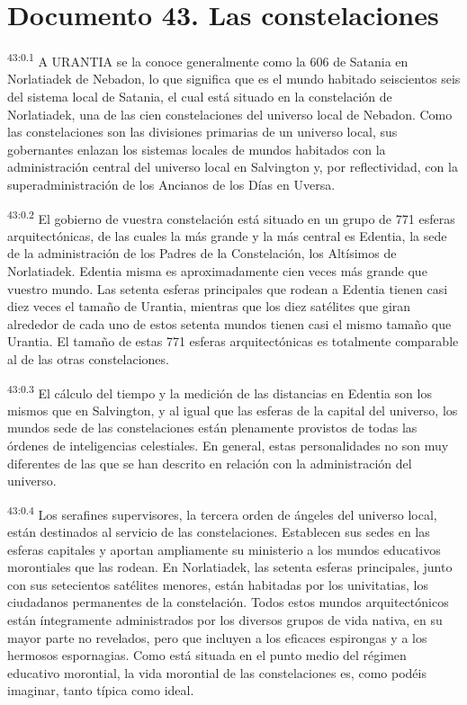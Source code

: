 \chapter{Documento 43. Las constelaciones}
\par
\textsuperscript{43:0.1} A URANTIA se la conoce generalmente como la 606 de Satania en Norlatiadek de Nebadon, lo que significa que es el mundo habitado seiscientos seis del sistema local de Satania, el cual está situado en la constelación de Norlatiadek, una de las cien constelaciones del universo local de Nebadon. Como las constelaciones son las divisiones primarias de un universo local, sus gobernantes enlazan los sistemas locales de mundos habitados con la administración central del universo local en Salvington y, por reflectividad, con la superadministración de los Ancianos de los Días en Uversa.

\par
\textsuperscript{43:0.2} El gobierno de vuestra constelación está situado en un grupo de
771 esferas arquitectónicas, de las cuales la más grande y la más central es Edentia, la sede de la administración de los Padres de la Constelación, los Altísimos de Norlatiadek. Edentia misma es aproximadamente cien veces más grande que vuestro mundo. Las setenta esferas principales que rodean a Edentia tienen casi diez veces el tamaño de Urantia, mientras que los diez satélites que giran alrededor de cada uno de estos setenta mundos tienen casi el mismo tamaño que Urantia. El tamaño de estas 771 esferas arquitectónicas es totalmente comparable al de las otras constelaciones.

\par
\textsuperscript{43:0.3} El cálculo del tiempo y la medición de las distancias en Edentia son los mismos que en Salvington, y al igual que las esferas de la capital del universo, los mundos sede de las constelaciones están plenamente provistos de todas las órdenes de inteligencias celestiales. En general, estas personalidades no son muy diferentes de las que se han descrito en relación con la administración del universo.

\par
\textsuperscript{43:0.4} Los serafines supervisores, la tercera orden de ángeles del universo local, están destinados al servicio de las constelaciones. Establecen sus sedes en las esferas capitales y aportan ampliamente su ministerio a los mundos educativos morontiales que las rodean. En Norlatiadek, las setenta esferas principales, junto con sus setecientos satélites menores, están habitadas por los univitatias, los ciudadanos permanentes de la constelación. Todos estos mundos arquitectónicos están íntegramente administrados por los diversos grupos de vida nativa, en su mayor parte no revelados, pero que incluyen a los eficaces espirongas y a los hermosos espornagias. Como está situada en el punto medio del régimen educativo morontial, la vida morontial de las constelaciones es, como podéis imaginar, tanto típica como ideal.

